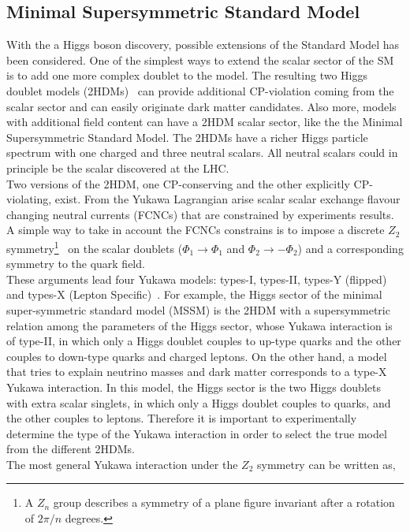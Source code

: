 \subsection*{Minimal Supersymmetric Standard Model} 
With the a Higgs boson discovery, possible extensions of the Standard Model has been considered. 
One of the simplest ways to extend the scalar sector of the SM is to add one more complex doublet to the model.
The resulting two Higgs doublet models (2HDMs)~\cite{Barroso:2013zxa} can provide additional CP-violation coming from the scalar 
sector and can easily originate dark matter candidates.  
Also more,  models with additional field content can have a 2HDM scalar sector, like the  the Minimal Supersymmetric Standard Model.  
The 2HDMs have a richer Higgs particle spectrum with one
charged and three neutral scalars.  All neutral scalars could in principle be the scalar discovered at the LHC.\\
Two versions of the 2HDM,  one CP-conserving and the other explicitly  CP-violating, exist.   
From the Yukawa Lagrangian arise scalar  scalar  exchange  flavour changing neutral currents (FCNCs) that are constrained by experiments results.
A simple way to take in account the FCNCs constrains is to impose a discrete $Z_2$ symmetry\footnote{A $Z_n$ group describes a symmetry of a plane figure invariant after a rotation of $2\pi/n$ degrees. }~\cite{PhysRevD.15.1958} on the scalar doublets ($\Phi_{1} \to \Phi_{1}$ and  $\Phi_{2} \to -\Phi_{2}$)  and a corresponding symmetry to the quark field.\\
These arguments  lead four Yukawa models: types-I, types-II, types-Y (flipped) and types-X (Lepton Specific)~\cite{PhysRevD.41.3421, PhysRevD.80.015017}. 
For example, the Higgs sector of the minimal super-symmetric standard model (MSSM) is the 2HDM with a supersymmetric relation  among
the parameters of the Higgs sector, whose Yukawa interaction is of type-II, in which only
a Higgs doublet couples to up-type quarks and the other couples to down-type quarks and charged leptons.
On the other hand, a  model that tries to explain neutrino masses and dark matter corresponds to a type-X  Yukawa interaction.
In this model,  the Higgs sector is the two Higgs doublets with extra scalar singlets,  in which only a Higgs doublet couples to quarks, and the other couples to leptons. Therefore it is important to experimentally determine the type of the Yukawa interaction in order to select the true model from the different 2HDMs.\\
The most general Yukawa interaction under the $Z_2$ symmetry can be written as,
